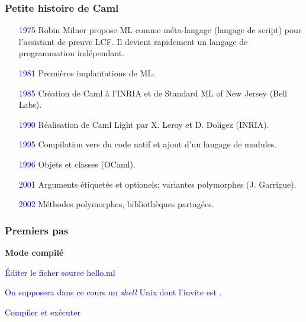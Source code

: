 
%
\begin{frame}
\frametitle{Petite histoire de Caml}

\begin{itemize}

  \item [\textcolor{blue}{1975}] Robin Milner propose ML comme
    méta-langage (langage de script) pour l'assistant de preuve
    LCF. Il devient rapidement un langage de programmation
    indépendant.

  \item [\textcolor{blue}{1981}] Premières implantations de ML.

  \item [\textcolor{blue}{1985}] Création de Caml à l'INRIA et de
    Standard ML of New Jersey (Bell Labs).

  \item [\textcolor{blue}{1990}] Réalisation de Caml Light par
    X. Leroy et D. Doligez (INRIA).

  \item [\textcolor{blue}{1995}] Compilation vers du code natif et
    ajout d'un langage de modules.

  \item [\textcolor{blue}{1996}] Objets et classes (OCaml).

  \item [\textcolor{blue}{2001}] Arguments étiquetés et optionels;
    variantes polymorphes (J. Garrigue).

  \item [\textcolor{blue}{2002}] Méthodes polymorphes, bibliothèques
    partagées.

\end{itemize}

\end{frame}


%
\begin{frame}
\frametitle{Premiers pas}

\centerline{\textbf{Mode compilé}}

\textcolor{blue}{Éditer le ficher source \textsf{hello.ml}}


\textcolor{blue}{On supposera dans ce cours un \emph{shell} Unix dont l'invite
est \shellprompt{}.}

\textcolor{blue}{Compiler et exécuter}

\\
\\

\end{frame}

